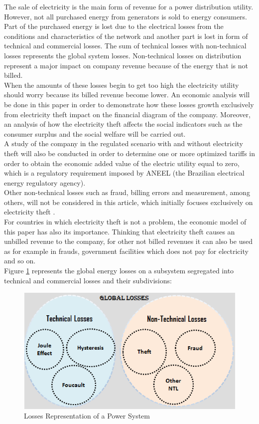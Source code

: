 \documentclass[10pt, letterpaper]{elsarticle}
\begin{document}
The sale of electricity is the main form of revenue for a power distribution utility. However, not all purchased energy from generators is sold to energy consumers. Part of the purchased energy is lost due to the electrical losses from the conditions and characteristics of the network and another part is lost in form of technical and commercial losses. The sum of technical losses with non-technical losses represents the global system losses. Non-technical losses on distribution represent a major impact on company revenue because of the energy that is not billed.\\
When the amounts of these losses begin to get too high the electricity utility should worry because its billed revenue become lower. An economic analysis will be done in this paper in order to demonstrate how these losses growth exclusively from electricity theft impact on the financial diagram of the company.
Moreover, an analysis of how the electricity theft affects the social indicators such as the consumer surplus and the social welfare will be carried out. \\
A study of the company in the regulated scenario with and without electricity theft will also be conducted in order to determine one or more optimized tariffs in order to obtain the economic added value of the electric utility equal to zero, which is a regulatory requirement imposed by ANEEL (the Brazilian electrical energy regulatory agency).\\
Other non-technical losses such as fraud, billing errors and measurement, among others, will not be considered in this article, which initially focuses exclusively on electricity theft \citet{Penin2008CombatPortuguese} \citet{Smith2004ElectricityAnalysis} \citet{Amin2015Game-theoreticInfrastructure}.\\
For countries in which electricity theft is not a problem, the economic model of this paper has also its importance. Thinking that electricity theft causes an unbilled revenue to the company, for other not billed revenues it can also be used as for example in frauds, government facilities which does not pay for electricity and so on.\\
Figure \ref{Fig1} represents the global energy losses on a subsystem segregated into technical and commercial losses and their subdivisions:\\

\begin{figure}[h]
\centering\includegraphics[width=0.8\linewidth]{Fig1.png}
\caption{Losses Representation of a Power System}
\label{Fig1}
\end{figure}
\end{document}
